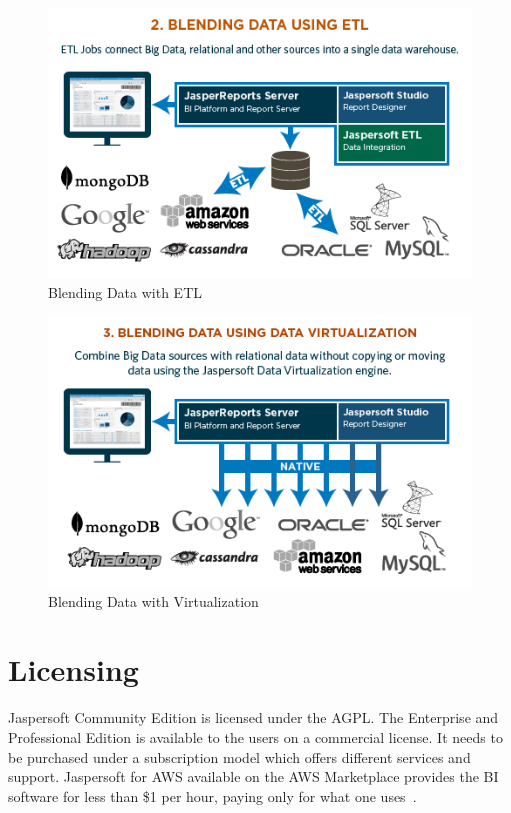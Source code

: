 \begin{figure}[!ht]
        \centering\includegraphics[width=\columnwidth]{../images/blending-with-etl.png}
        \caption{Blending Data with ETL~\cite{hid-sp18-516-www-jaspersoft-big-data}}
        \label{fig:blending-with-etl}
\end{figure}

\begin{figure}[!ht]
        \centering\includegraphics[width=\columnwidth]{../images/blending-with-virtualization.png}
        \caption{Blending Data with Virtualization~\cite{hid-sp18-516-www-jaspersoft-big-data}}
        \label{fig:blending-with-virtualization}
\end{figure}


\section{Licensing}
Jaspersoft Community Edition is licensed under the AGPL. The Enterprise and
Professional Edition is available to the users on a commercial license. It needs
to be purchased under a subscription model which offers different services and
support. Jaspersoft for AWS available on the AWS Marketplace provides the BI
software for less than \$1 per hour, paying only for what one
uses~\cite{hid-sp18-516-www-jaspersoft-licensing}. 


